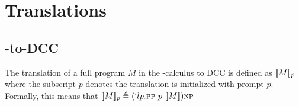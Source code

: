 \chapter{Translations}

%
\section{\lmu-to-DCC}



The translation of a full program $M$ in the \lmu-calculus to DCC is
defined as $\llbracket M \rrbracket_{p}$ where the subscript $p$ denotes the 
translation is initialized with prompt $p$. Formally, this means that
$\llbracket M \rrbracket_{p} \triangleq (`lp.\textsc{pp}\ p\ \llbracket M \rrbracket)\textsc{np}$



